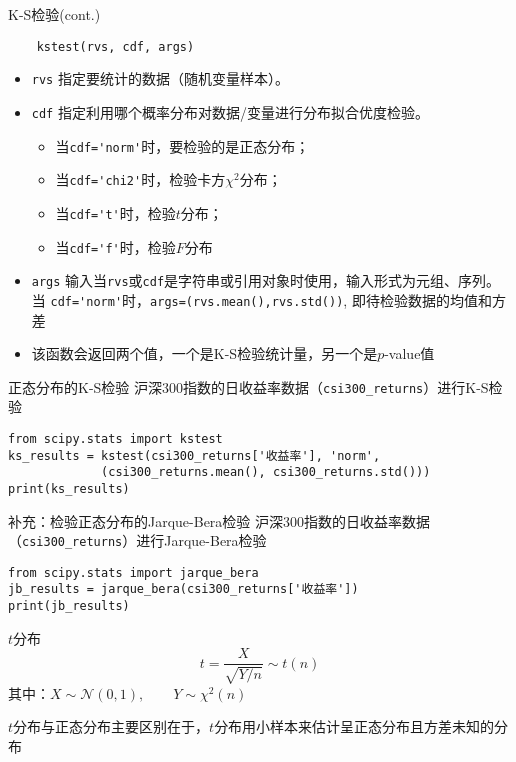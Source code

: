 \documentclass[t]{beamer}
\begin{document}
\begin{frame}[fragile]{K-S检验(cont.)}
\begin{lstlisting}
    kstest(rvs, cdf, args)
\end{lstlisting}
\begin{itemize}
    \item \verb|rvs| 指定要统计的数据（随机变量样本）。
    \item \verb|cdf| 指定利用哪个概率分布对数据/变量进行分布拟合优度检验。
    \begin{itemize}
        \item 当\verb|cdf='norm'|时，要检验的是正态分布；
        \item 当\verb|cdf='chi2'|时，检验卡方$\chi^2$分布；
        \item 当\verb|cdf='t'|时，检验$t$分布；
        \item 当\verb|cdf='f'|时，检验$F$分布
    \end{itemize}
    
    \item \verb|args| 输入当\verb|rvs|或\verb|cdf|是字符串或引用对象时使用，输入形式为元组、序列。    
    当
    \verb|cdf='norm'|时，\verb|args=(rvs.mean(),rvs.std())|, 即待检验数据的均值和方差
    \item 该函数会返回两个值，一个是K-S检验统计量，另一个是$p$-value值
\end{itemize}
\end{frame}


\begin{frame}[fragile]{正态分布的K-S检验}
沪深300指数的日收益率数据（\verb|csi300_returns|）进行K-S检验
\begin{lstlisting}
from scipy.stats import kstest 
ks_results = kstest(csi300_returns['收益率'], 'norm', 
             (csi300_returns.mean(), csi300_returns.std()))
print(ks_results)
\end{lstlisting}
\end{frame}

\begin{frame}[fragile]{补充：检验正态分布的Jarque-Bera检验}
沪深300指数的日收益率数据（\verb|csi300_returns|）进行Jarque-Bera检验
\begin{lstlisting}
from scipy.stats import jarque_bera
jb_results = jarque_bera(csi300_returns['收益率'])
print(jb_results)
\end{lstlisting}
\end{frame}



\begin{frame}[fragile]{$t$分布}
\[t=\frac{X}{\sqrt{Y/n}}\sim t(n)\]
其中：$X\sim \mathcal{N}(0,1),\qquad Y\sim \chi^2(n)$

$t$分布与正态分布主要区别在于，$t$分布用小样本来估计呈正态分布且方差未知的分布
\end{frame}
\end{document}
